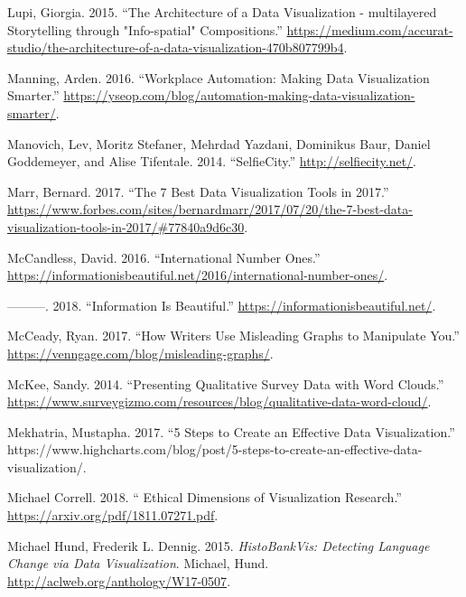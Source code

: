 \documentclass[]{book}
\begin{document}
\leavevmode\hypertarget{ref-Lupi}{}%
Lupi, Giorgia. 2015. ``The Architecture of a Data Visualization - multilayered Storytelling through "Info-spatial" Compositions.'' \url{https://medium.com/accurat-studio/the-architecture-of-a-data-visualization-470b807799b4}.

\leavevmode\hypertarget{ref-work_place}{}%
Manning, Arden. 2016. ``Workplace Automation: Making Data Visualization Smarter.'' \url{https://yseop.com/blog/automation-making-data-visualization-smarter/}.

\leavevmode\hypertarget{ref-selfie}{}%
Manovich, Lev, Moritz Stefaner, Mehrdad Yazdani, Dominikus Baur, Daniel Goddemeyer, and Alise Tifentale. 2014. ``SelfieCity.'' \url{http://selfiecity.net/}.

\leavevmode\hypertarget{ref-7_best_tools}{}%
Marr, Bernard. 2017. ``The 7 Best Data Visualization Tools in 2017.'' \url{https://www.forbes.com/sites/bernardmarr/2017/07/20/the-7-best-data-visualization-tools-in-2017/\#77840a9d6c30}.

\leavevmode\hypertarget{ref-country_chart}{}%
McCandless, David. 2016. ``International Number Ones.'' \url{https://informationisbeautiful.net/2016/international-number-ones/}.

\leavevmode\hypertarget{ref-info_beautiful}{}%
---------. 2018. ``Information Is Beautiful.'' \url{https://informationisbeautiful.net/}.

\leavevmode\hypertarget{ref-writers_manipulate}{}%
McCeady, Ryan. 2017. ``How Writers Use Misleading Graphs to Manipulate You.'' \url{https://venngage.com/blog/misleading-graphs/}.

\leavevmode\hypertarget{ref-wordcloud}{}%
McKee, Sandy. 2014. ``Presenting Qualitative Survey Data with Word Clouds.'' \url{https://www.surveygizmo.com/resources/blog/qualitative-data-word-cloud/}.

\leavevmode\hypertarget{ref-chart_audience}{}%
Mekhatria, Mustapha. 2017. ``5 Steps to Create an Effective Data Visualization.'' https://www.highcharts.com/blog/post/5-steps-to-create-an-effective-data-visualization/.

\leavevmode\hypertarget{ref-ethical_dim}{}%
Michael Correll. 2018. `` Ethical Dimensions of Visualization Research.'' \href{\%20https://arxiv.org/pdf/1811.07271.pdf}{https://arxiv.org/pdf/1811.07271.pdf}.

\leavevmode\hypertarget{ref-lingui_data1}{}%
Michael Hund, Frederik L. Dennig. 2015. \emph{HistoBankVis: Detecting Language Change via Data Visualization}. Michael, Hund. \url{http://aclweb.org/anthology/W17-0507}.
\end{document}
